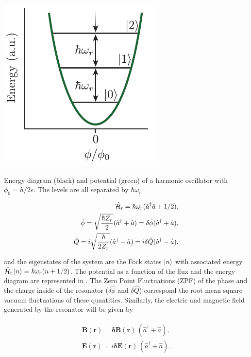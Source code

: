 \begin{marginfigure}
    \includegraphics{chapter2/figures/resonator_energy.pdf}
    \caption[Energy of a harmonic oscillator]{Energy diagram (black) and potential (green) of a harmonic oscillator with $\phi_0=  h/2e$. The levels are all separated by $\hbar\omega_r$}
\end{marginfigure}


\begin{align}
\begin{split}
    \hat{\mathcal{H}}_{\text{r}} = \hbar \omega_r(\hat{a}^\dagger \hat{a} + 1/2), \\
    \hat{\phi} = \sqrt{\frac{\hbar Z_r}{2}} (\hat{a}^\dagger + \hat{a}) = \delta \hat{\phi} (\hat{a}^\dagger + \hat{a}), \\
    \hat{Q} = i \sqrt{\frac{\hbar}{2 Z_r}} (\hat{a}^\dagger - \hat{a}) = i \delta \hat{Q} (\hat{a}^\dagger - \hat{a}),
\end{split}
\end{align}

\noindent and the eigenstates of the system are the Fock states $\ket{n}$ with associated energy $\hat{\mathcal{H}}_{\text{r}}\ket{n} = \hbar \omega_r (n + 1/2)$. The potential as a function of the flux and the energy diagram are represented in . The Zero Point Fluctuations (ZPF) of the phase and the charge inside of the resonator ($\delta \hat{\phi}$ and $\delta \hat{Q}$) correspond the root mean square vacuum fluctuations of these quantities. Similarly, the electric and magnetic field generated by the resonator will be given by

\begin{align}
\begin{split}
    \mathbf{B}(\mathbf{r}) =   \boldsymbol{\delta}\mathbf{B}(\mathbf{r}) \, (\hat{a}^\dagger + \hat{a}), \\
    \mathbf{E}(\mathbf{r}) = i \boldsymbol{\delta}\mathbf{E}(\mathbf{r}) \, (\hat{a}^\dagger + \hat{a}). 
\end{split}
\end{align}

